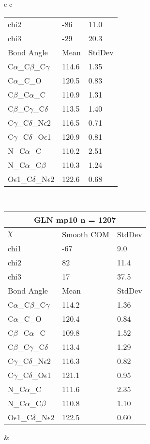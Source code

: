 \begin{longtable}{ c c }
\begin{tabular}{ l l l }
  chi2 & -86 & 11.0 \\ 
  chi3 & -29 & 20.3 \\ \midrule
  Bond Angle   & Mean     & StdDev \\ \midrule
  C$\alpha$\_C$\beta$\_C$\gamma$ & 114.6 & 1.35\\
  C$\alpha$\_C\_O & 120.5 & 0.83\\
  C$\beta$\_C$\alpha$\_C & 110.9 & 1.31\\
  C$\beta$\_C$\gamma$\_C$\delta$ & 113.5 & 1.40\\
  C$\gamma$\_C$\delta$\_N$\epsilon$2 & 116.5 & 0.71\\
  C$\gamma$\_C$\delta$\_O$\epsilon$1 & 120.9 & 0.81\\
  N\_C$\alpha$\_C & 110.2 & 2.51\\
  N\_C$\alpha$\_C$\beta$ & 110.3 & 1.24\\
  O$\epsilon$1\_C$\delta$\_N$\epsilon$2 & 122.6 & 0.68\\
  \bottomrule
  \end{tabular}
  \\
  \begin{tabular}{ l l l }
  \toprule
  \multicolumn{3}{c}{GLN \textbf{mp10} n = 1207} \\ \toprule
  $\chi$       & Smooth COM & StdDev \\ \midrule
  chi1 & -67 & 9.0 \\ 
  chi2 & 82 & 11.4 \\ 
  chi3 & 17 & 37.5 \\ \midrule
  Bond Angle   & Mean     & StdDev \\ \midrule
  C$\alpha$\_C$\beta$\_C$\gamma$ & 114.2 & 1.36\\
  C$\alpha$\_C\_O & 120.4 & 0.84\\
  C$\beta$\_C$\alpha$\_C & 109.8 & 1.52\\
  C$\beta$\_C$\gamma$\_C$\delta$ & 113.4 & 1.29\\
  C$\gamma$\_C$\delta$\_N$\epsilon$2 & 116.3 & 0.82\\
  C$\gamma$\_C$\delta$\_O$\epsilon$1 & 121.1 & 0.95\\
  N\_C$\alpha$\_C & 111.6 & 2.35\\
  N\_C$\alpha$\_C$\beta$ & 110.8 & 1.10\\
  O$\epsilon$1\_C$\delta$\_N$\epsilon$2 & 122.5 & 0.60\\
  \bottomrule
  \end{tabular}
  &
  \begin{tabular}{ l l l }
  \toprule

\end{tabular}
\end{longtable}
